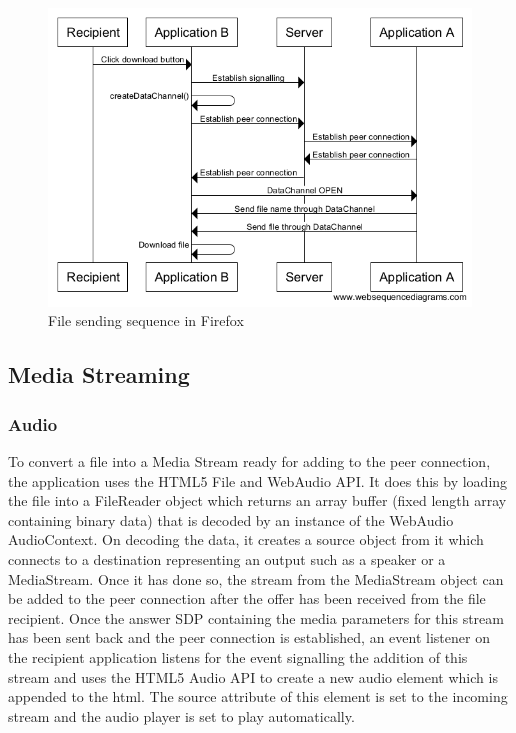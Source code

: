 \documentclass[]{report}
\begin{document}
			\begin{figure}[H]
				\caption{File sending sequence in Firefox}
				\centering
				\includegraphics[scale=0.5]{file-sending-sequence-firefox.png}
			\end{figure}	
			
			\subsection{Media Streaming}
				\subsubsection{Audio}
				To convert a file into a Media Stream ready for adding to the peer connection, the application uses the HTML5 File and WebAudio API. It does this by loading the file into a FileReader object which returns an array buffer (fixed length array containing binary data) that is decoded by an instance of the WebAudio AudioContext. On decoding the data, it creates a source object from it which connects to a destination representing an output such as a speaker or a MediaStream. Once it has done so, the stream from the MediaStream object can be added to the peer connection after the offer has been received from the file recipient. Once the answer SDP containing the media parameters for this stream has been sent back and the peer connection is established, an event listener on the recipient application listens for the event signalling the addition of this stream and uses the HTML5 Audio API to create a new audio element which is appended to the html. The source attribute of this element is set to the incoming stream and the audio player is set to play automatically.
				
\end{document}
